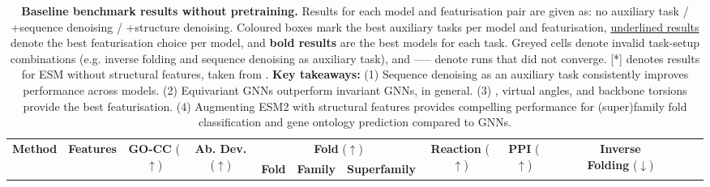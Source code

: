\begin{landscape}

\begin{table}[!t]

\caption{
\textbf{Baseline benchmark results without pretraining.} Results for each model and featurisation pair are given as: \colorbox{orange!20}{no auxiliary task} / \colorbox{blue!20}{+sequence denoising} / \colorbox{green!20}{+structure denoising}. Coloured boxes mark the best auxiliary tasks per model and featurisation, \underline{underlined results} denote the best featurisation choice per model, and \textbf{bold results} are the best models for each task. 
\colorbox{gray!20}{Greyed} cells denote invalid task-setup combinations (e.g. inverse folding and sequence denoising as auxiliary task), and ----- denote runs that did not converge. 
[*] denotes results for ESM without structural features, taken from \citet{zhang2023protein}.
\textbf{Key takeaways:} (1) Sequence denoising as an auxiliary task consistently improves performance across models.
(2) Equivariant GNNs outperform invariant GNNs, in general.
(3) \caa, virtual angles, and backbone torsions provide the best featurisation.
(4) Augmenting ESM2 with structural features provides compelling performance for (super)family fold classification and gene ontology prediction compared to GNNs.
}
\label{tab:baseline_graph_classification_results}

\begin{adjustbox}{max width=\linewidth}
\begin{tabular}{lllcccccccccccccl}
\toprule
\multirow{2}{*}{\textbf{Method}} & \multicolumn{1}{c}{\multirow{2}{*}{\textbf{Features}}} &%
\multicolumn{3}{c}{\multirow{2}{*}{\textbf{GO-CC} ($\uparrow$)}} & \multirow{2}{*}{\textbf{Ab. Dev.} ($\uparrow$)} & \multicolumn{3}{c}{\textbf{Fold} ($\uparrow$)} & \multirow{2}{*}{\textbf{Reaction} ($\uparrow$)} & \multirow{2}{*}{\textbf{PPI} ($\uparrow$)} &
& &
\multirow{2}{*}{\textbf{Inverse Folding} ($\downarrow$)}\\
\cmidrule{7-9}
 & & &
 & & \multicolumn{1}{c}{} & \textbf{Fold} & \textbf{Family} & \textbf{Superfamily} &  &  &  &  &  &  &  &   \\
\midrule 



\end{tabular}
\end{adjustbox}
\end{table}
\end{landscape}
